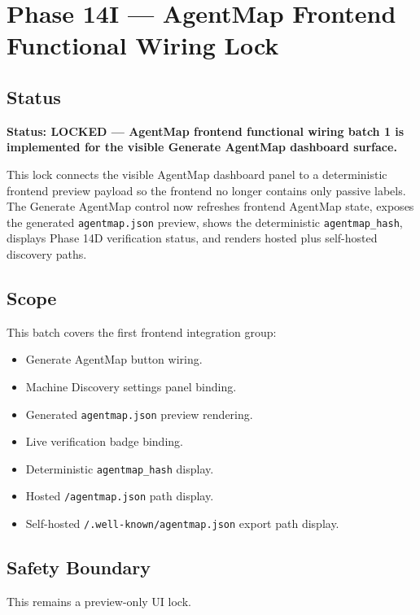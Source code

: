 \section{Phase 14I --- AgentMap Frontend Functional Wiring Lock}
\label{sec:phase14-agentmap-frontend-functional-wiring-lock}

\subsection{Status}

\textbf{Status: LOCKED --- AgentMap frontend functional wiring batch 1 is implemented for the visible Generate AgentMap dashboard surface.}

This lock connects the visible AgentMap dashboard panel to a deterministic frontend preview payload so the frontend no longer contains only passive labels. The Generate AgentMap control now refreshes frontend AgentMap state, exposes the generated \texttt{agentmap.json} preview, shows the deterministic \texttt{agentmap\_hash}, displays Phase 14D verification status, and renders hosted plus self-hosted discovery paths.

\subsection{Scope}

This batch covers the first frontend integration group:

\begin{itemize}
  \item Generate AgentMap button wiring.
  \item Machine Discovery settings panel binding.
  \item Generated \texttt{agentmap.json} preview rendering.
  \item Live verification badge binding.
  \item Deterministic \texttt{agentmap\_hash} display.
  \item Hosted \texttt{/agentmap.json} path display.
  \item Self-hosted \texttt{/.well-known/agentmap.json} export path display.
\end{itemize}

\subsection{Safety Boundary}

This remains a preview-only UI lock.

